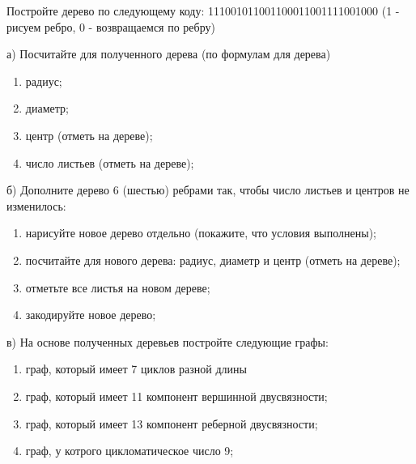\question 
Постройте дерево по следующему коду: 111001011001100011001111001000 (1 - рисуем ребро, 0 - возвращаемся по ребру)

а) Посчитайте для полученного дерева (по формулам для дерева)
\begin{enumerate}
\item радиус;
\item диаметр;
\item центр (отметь на дереве);
\item число листьев (отметь на дереве);
\end{enumerate}

б) Дополните дерево 6 (шестью) ребрами так, чтобы число листьев и центров не изменилось:
\begin{enumerate}
\item нарисуйте новое дерево отдельно (покажите, что условия выполнены);
\item посчитайте для нового дерева: радиус, диаметр и центр (отметь на дереве);
\item отметьте все листья на  новом дереве;
\item закодируйте новое дерево;
\end{enumerate}

в) На основе полученных деревьев  постройте следующие графы:
\begin{enumerate}
\item граф, который имеет 7 циклов разной длины
\item граф, который имеет 11 компонент вершинной двусвязности;
\item граф, который имеет 13 компонент реберной двусвязности;
\item граф, у котрого цикломатическое число 9;
\end{enumerate}